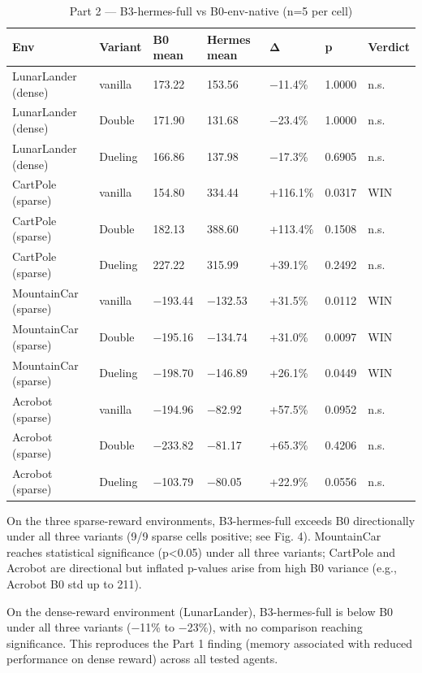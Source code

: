 \documentclass[conference,letterpaper,10pt]{IEEEtran}
\begin{document}
\begin{table}[t]
\centering
\caption{Part 2 --- B3-hermes-full vs B0-env-native (n=5 per cell)}
\small
\begin{tabular}{@{}lllllll@{}}
\toprule
Env & Variant & B0 mean & Hermes mean & Δ & p & Verdict \\
\midrule
LunarLander (dense) & vanilla & 173.22 & 153.56 & −11.4\% & 1.0000 & n.s. \\
LunarLander (dense) & Double & 171.90 & 131.68 & −23.4\% & 1.0000 & n.s. \\
LunarLander (dense) & Dueling & 166.86 & 137.98 & −17.3\% & 0.6905 & n.s. \\
CartPole (sparse) & vanilla & 154.80 & 334.44 & +116.1\% & 0.0317 & WIN \\
CartPole (sparse) & Double & 182.13 & 388.60 & +113.4\% & 0.1508 & n.s. \\
CartPole (sparse) & Dueling & 227.22 & 315.99 & +39.1\% & 0.2492 & n.s. \\
MountainCar (sparse) & vanilla & −193.44 & −132.53 & +31.5\% & 0.0112 & WIN \\
MountainCar (sparse) & Double & −195.16 & −134.74 & +31.0\% & 0.0097 & WIN \\
MountainCar (sparse) & Dueling & −198.70 & −146.89 & +26.1\% & 0.0449 & WIN \\
Acrobot (sparse) & vanilla & −194.96 & −82.92 & +57.5\% & 0.0952 & n.s. \\
Acrobot (sparse) & Double & −233.82 & −81.17 & +65.3\% & 0.4206 & n.s. \\
Acrobot (sparse) & Dueling & −103.79 & −80.05 & +22.9\% & 0.0556 & n.s. \\
\bottomrule
\end{tabular}
\end{table}


On the three sparse-reward environments, B3-hermes-full exceeds B0 directionally under all three variants (9/9 sparse cells positive; see Fig. 4). MountainCar reaches statistical significance (p\textless0.05) under all three variants; CartPole and Acrobot are directional but inflated p-values arise from high B0 variance (e.g., Acrobot B0 std up to 211).

On the dense-reward environment (LunarLander), B3-hermes-full is below B0 under all three variants (−11\% to −23\%), with no comparison reaching significance. This reproduces the Part 1 finding (memory associated with reduced performance on dense reward) across all tested agents.
\end{document}
